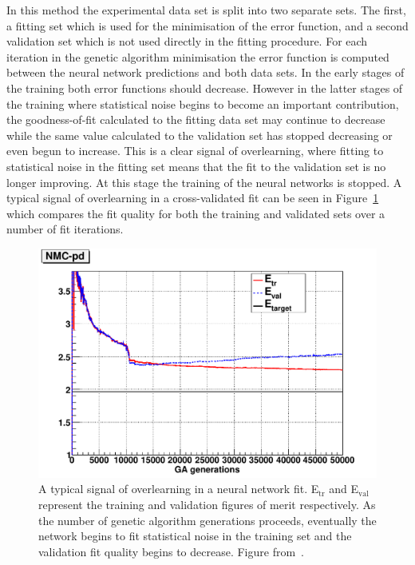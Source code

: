 In this method the experimental data set is split into two separate sets. The first, a fitting set which is used for the minimisation of the error function, and a second validation set which is not used directly in the fitting procedure. For each iteration in the genetic algorithm minimisation the error function is computed between the neural network predictions and both data sets. In the early stages of the training both error functions should decrease. However in the latter stages of the training where statistical noise begins to become an important contribution, the goodness-of-fit calculated to the fitting data set may continue to decrease while the same value calculated to the validation set has stopped decreasing or even begun to increase. This is a clear signal of overlearning, where fitting to statistical noise in the fitting set means that the fit to the validation set is no longer improving. At this stage the training of the neural networks is stopped. A typical signal of overlearning in a cross-validated fit can be seen in Figure~\ref{fig:crossval} which compares the fit quality for both the training and validated sets over a number of fit iterations.

\begin{figure}[ht]
\centering
\includegraphics[scale=0.5]{3-PDFdet/figs/chi2ite-1004-NMC-pd.pdf}
\caption[Demonstration of overlearning in the cross-validation of a neural network fit]{A typical signal of overlearning in a neural network fit. E$_{\mathrm{tr}}$ and E$_{\mathrm{val}}$ represent the training and validation figures of merit respectively. As the number of genetic algorithm generations proceeds, eventually the network begins to fit statistical noise in the training set and the validation fit quality begins to decrease. Figure from~\cite{Ball:2010de}.}
\label{fig:crossval}
\end{figure}

